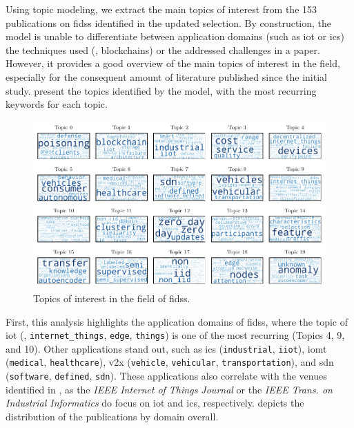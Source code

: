 Using topic modeling, we extract the main topics of interest from the 153 publications on \glspl{fids} identified in the updated selection.
By construction, the model is unable to differentiate between application domains (such as \gls{iot} or \gls{ics}) the techniques used (\eg, blockchains) or the addressed challenges in a paper.
However, it provides a good overview of the main topics of interest in the field, especially for the consequent amount of literature published since the initial study.
 present the topics identified by the model, with the most recurring keywords for each topic.


\begin{figure}
  \centering
  \includegraphics[width=\textwidth]{figures/topic_clouds.pdf}
  \caption{
    Topics of interest in the field of \glspl{fids}.
    \label{fig:sota.topics}
  }
\end{figure}

First, this analysis highlights the application domains of \glspl{fids}, where the topic of \gls{iot} (\ie, \texttt{internet\_things}, \texttt{edge}, \texttt{things}) is one of the most recurring (Topics 4, 9, and 10).
Other applications stand out, such as \gls{ics} (\texttt{industrial}, \texttt{iiot}), \gls{iomt} (\texttt{medical}, \texttt{healthcare}), \gls{v2x} (\texttt{vehicle}, \texttt{vehicular}, \texttt{transportation}), and \gls{sdn} (\texttt{software}, \texttt{defined}, \texttt{sdn}).
These applications also correlate with the venues identified in , as the \emph{IEEE Internet of Things Journal} or the \emph{IEEE Trans. on Industrial Informatics} do focus on \gls{iot} and \gls{ics}, respectively.
 depicts the distribution of the publications by domain overall.

